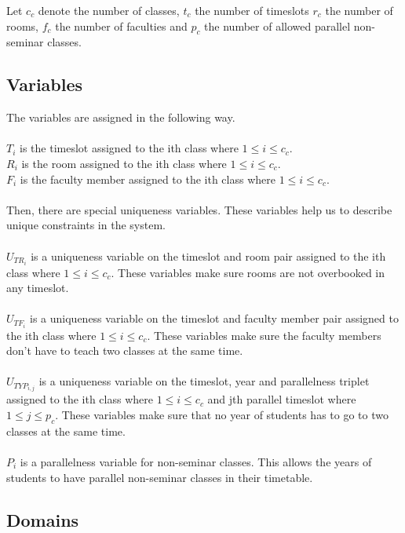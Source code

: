 Let $c_c$ denote the number of classes, $t_c$ the number of timeslots $r_c$ the number of rooms, $f_c$ the number of faculties and $p_c$ the number of allowed parallel non-seminar classes.\\

\subsection{Variables}

The variables are assigned in the following way.\\
\\
$T_i$ is the timeslot assigned to the ith class where $1\leq{}i\leq{}c_c$.\\
$R_i$ is the room assigned to the ith class where $1\leq{}i\leq{}c_c$.\\
$F_i$ is the faculty member assigned to the ith class where $1\leq{}i\leq{}c_c$.\\
\\
Then, there are special uniqueness variables. These variables help us to describe unique constraints in the system.  \\
\\
$U_{TR_i}$ is a uniqueness variable on the timeslot and room pair assigned to the ith class where $1\leq{}i\leq{}c_c$. These variables make sure rooms are not overbooked in any timeslot.\\\\
$U_{TF_i}$ is a uniqueness variable on the timeslot and faculty member pair assigned to the ith class where $1\leq{}i\leq{}c_c$. These variables make sure the faculty members don't have to teach two classes at the same time.\\\\
$U_{TYP_{i,j}}$ is a uniqueness variable on the timeslot, year and parallelness triplet assigned to the ith class where $1\leq{}i\leq{}c_c$ and jth parallel timeslot where $1\leq{}j\leq{}p_c$. These variables make sure that no year of students has to go to two classes at the same time.\\\\
$P_{i}$ is a parallelness variable for non-seminar classes. This allows the years of students to have parallel non-seminar classes in their timetable. \\

\subsection{Domains}

